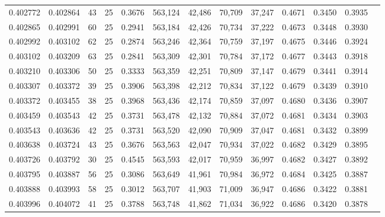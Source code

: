 \begin{tabular}{rrrrrrrrrrrrr}
0.402772 & 0.402864 &    43 &  25 &                                     0.3676 & 563,124 &  42,486 &  70,709 &  37,247 & 0.4671 & 0.3450 & 0.3935 \\
0.402865 & 0.402991 &    60 &  25 &                                     0.2941 & 563,184 &  42,426 &  70,734 &  37,222 & 0.4673 & 0.3448 & 0.3930 \\
0.402992 & 0.403102 &    62 &  25 &                                     0.2874 & 563,246 &  42,364 &  70,759 &  37,197 & 0.4675 & 0.3446 & 0.3924 \\
0.403102 & 0.403209 &    63 &  25 &                                     0.2841 & 563,309 &  42,301 &  70,784 &  37,172 & 0.4677 & 0.3443 & 0.3918 \\
0.403210 & 0.403306 &    50 &  25 &                                     0.3333 & 563,359 &  42,251 &  70,809 &  37,147 & 0.4679 & 0.3441 & 0.3914 \\
0.403307 & 0.403372 &    39 &  25 &                                     0.3906 & 563,398 &  42,212 &  70,834 &  37,122 & 0.4679 & 0.3439 & 0.3910 \\
0.403372 & 0.403455 &    38 &  25 &                                     0.3968 & 563,436 &  42,174 &  70,859 &  37,097 & 0.4680 & 0.3436 & 0.3907 \\
0.403459 & 0.403543 &    42 &  25 &                                     0.3731 & 563,478 &  42,132 &  70,884 &  37,072 & 0.4681 & 0.3434 & 0.3903 \\
0.403543 & 0.403636 &    42 &  25 &                                     0.3731 & 563,520 &  42,090 &  70,909 &  37,047 & 0.4681 & 0.3432 & 0.3899 \\
0.403638 & 0.403724 &    43 &  25 &                                     0.3676 & 563,563 &  42,047 &  70,934 &  37,022 & 0.4682 & 0.3429 & 0.3895 \\
0.403726 & 0.403792 &    30 &  25 &                                     0.4545 & 563,593 &  42,017 &  70,959 &  36,997 & 0.4682 & 0.3427 & 0.3892 \\
0.403795 & 0.403887 &    56 &  25 &                                     0.3086 & 563,649 &  41,961 &  70,984 &  36,972 & 0.4684 & 0.3425 & 0.3887 \\
0.403888 & 0.403993 &    58 &  25 &                                     0.3012 & 563,707 &  41,903 &  71,009 &  36,947 & 0.4686 & 0.3422 & 0.3881 \\
0.403996 & 0.404072 &    41 &  25 &                                     0.3788 & 563,748 &  41,862 &  71,034 &  36,922 & 0.4686 & 0.3420 & 0.3878 \\

\end{tabular}
